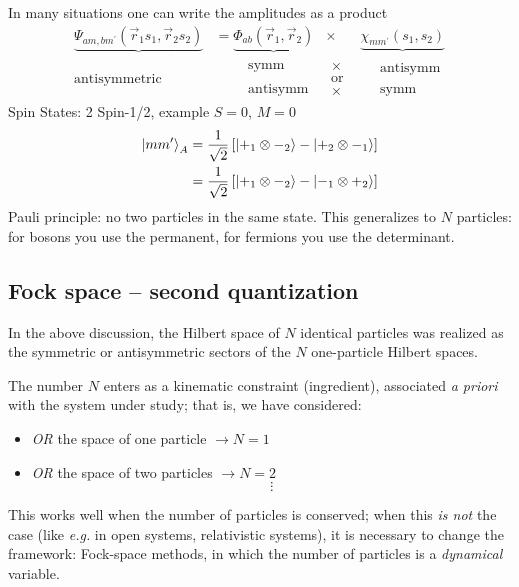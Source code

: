 \documentclass[12pt]{article}
\newcommand{\be}{\begin{equation}}
\newcommand{\ee}{\end{equation}}
\begin{document}
In many situations one can write the amplitudes
as a product
\be
\begin{aligned}
\underbrace{\Psi_{a m, b m^{\prime}}\left(\vec{r}_{1} s_{1}, \vec{r}_{2} s_{2}\right)}%
&=
\underbrace{\Phi_{ab}\left(\vec{r}_{1}, \vec{r}_{2}\right)} & \times &%
\underbrace{\chi_{mm^\prime}\left(s_{1}, s_{2}\right)}\\
\text{antisymmetric}\quad & \quad\quad \substack{\text{symm}\\\\\text{antisymm}} 
&\substack{\times\\\text{or}\\\times}& \quad \substack{\text{antisymm}\\\\\text{symm}} 
\end{aligned}
\ee
Spin States: 2 Spin-1/2, example $S=0$, $M=0$
\be
\begin{aligned}
\left|m m^{\prime}\right\rangle_{A} 
&=\frac{1}{\sqrt{2}}
\left[\ket{+_{1} \otimes-_{2}}-
      \ket{+_{2} \otimes-_{1}}\right] \\
&=\frac{1}{\sqrt{2}}
\left[\ket{+_{1} \otimes-_{2}}-
      \ket{-_{1} \otimes+_{2}}\right]
\end{aligned}
\ee
Pauli principle: no two particles in the same state.
This generalizes to $N$ particles:
for bosons you use the permanent,
for fermions you use the determinant.


\subsection{Fock space -- second quantization}

In the above discussion, the Hilbert space of $N$ identical
particles was realized as the symmetric or antisymmetric 
sectors of the $N$ one-particle Hilbert
spaces.

The number $N$ enters as a kinematic
constraint (ingredient), associated \textit{a priori}
with the system under study; that is,
we have considered:
\begin{itemize}
\item \emph{OR} the space of one particle $\rightarrow N=1$
\item \emph{OR} the space of two particles $\rightarrow N=2$
\[\vdots\]
\end{itemize}

This works well when the number of particles is
conserved; when this \emph{is not} the case (like \textit{e.g.} in open
systems, relativistic systems), it is necessary to change
the framework:
Fock-space methods, in which the number of
particles is a \emph{dynamical} variable.
\end{document}
